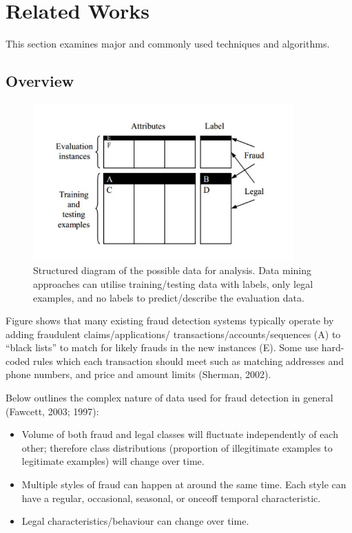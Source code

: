 \chapter{Related Works}

This section examines major and commonly used techniques and algorithms.
\section{Overview}
\begin{figure}
  \centering
  \includegraphics[width=10cm]{related_works}
  \caption{ Structured diagram of the possible data for analysis. Data
mining approaches can utilise training/testing data with labels, only legal
examples, and no labels to predict/describe the evaluation data.}\label{overview_fig}
\end{figure}

Figure \cite{overview_fig} shows that many existing fraud detection systems
typically operate by adding fraudulent claims/applications/
transactions/accounts/sequences (A) to “black lists” to match for likely
frauds in the new instances (E). Some use hard-coded rules which each
transaction should meet such as matching addresses and phone numbers, and
price and amount limits (Sherman, 2002).

Below outlines the complex nature of data used for fraud detection in general
(Fawcett, 2003; 1997):

\begin{itemize}
  \item Volume of both fraud and legal classes will fluctuate independently
      of each other; therefore class distributions (proportion of
      illegitimate examples to legitimate examples) will change over time.
  \item Multiple styles of fraud can happen at around the same time. Each
      style can have a regular, occasional, seasonal, or onceoff temporal
      characteristic.
  \item Legal characteristics/behaviour can change over time.
\end{itemize}

